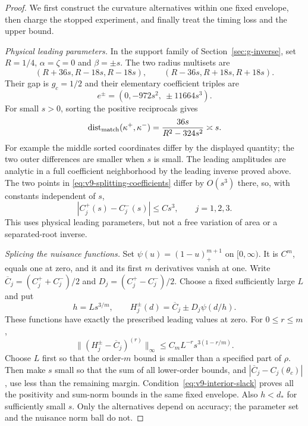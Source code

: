 \begin{proof}
We first construct the curvature alternatives within one fixed
envelope, then charge the stopped experiment, and finally treat the
timing loss and the upper bound.

\emph{Physical leading parameters.}
In the support family of Section~\ref{sec:g-inverse}, set
$R=1/4$, $\alpha=\zeta=0$ and $\beta=\pm s$.
The two radius multisets are
\[
 (R+36s,R-18s,R-18s),\qquad (R-36s,R+18s,R+18s).
\]
Their gap is $g_c=1/2$ and their elementary coefficient triples are
\begin{equation}\label{eq:v9-splitting-coefficients}
                  e^\pm=(0,-972s^2,\ \pm11664s^3).
\end{equation}
For small $s>0$, sorting the positive reciprocals gives
\begin{equation}\label{eq:v9-splitting-distance}
 \operatorname{dist}_{\rm match}(\kappa^+,\kappa^-)
                   =\frac{36s}{R^2-324s^2}\asymp s.
\end{equation}
For example the middle sorted coordinates differ by the displayed
quantity; the two outer differences are smaller when $s$ is small.
The leading amplitudes are analytic in a full coefficient
neighborhood by the leading inverse proved above. The two points
in \eqref{eq:v9-splitting-coefficients} differ by $O(s^3)$ there,
so, with constants independent of $s$,
\begin{equation}\label{eq:v9-cubic-leading}
              |C_j^+(s)-C_j^-(s)|\le C s^3,
                                      \qquad j=1,2,3.
\end{equation}
This uses physical leading parameters, but not a free variation of
area or a separated-root inverse.

\emph{Splicing the nuisance functions.}
Set $\psi(u)=(1-u)_+^{m+1}$ on $[0,\infty)$. It is $C^m$,
equals one at zero, and it and its first $m$ derivatives vanish at
one. Write
$\overline C_j=(C_j^++C_j^-)/2$ and
$D_j=(C_j^+-C_j^-)/2$. Choose a fixed sufficiently large $L$ and
put
\begin{equation}\label{eq:v9-nuisance-splice}
 h=L s^{3/m},\qquad
 H_j^\pm(d)=\overline C_j\pm D_j\psi(d/h).
\end{equation}
These functions have exactly the prescribed leading values at zero.
For $0\le r\le m$,
\begin{equation}\label{eq:v9-splice-norms}
 \|(H_j^\pm-\overline C_j)^{(r)}\|_\infty
            \le C_mL^{-r}s^{3(1-r/m)}.
\end{equation}
Choose $L$ first so that the order-$m$ bound is smaller than a
specified part of $\rho$. Then make $s$ small so that the sum of
all lower-order bounds, and
$|\overline C_j-C_j(\theta_c)|$, use less than the remaining
margin. Condition~\eqref{eq:v9-interior-slack} proves all the
positivity and sum-norm bounds in the same fixed envelope. Also
$h<d_*$ for sufficiently small $s$. Only the alternatives depend on
accuracy; the parameter set and the nuisance norm ball do not.


\end{proof}
